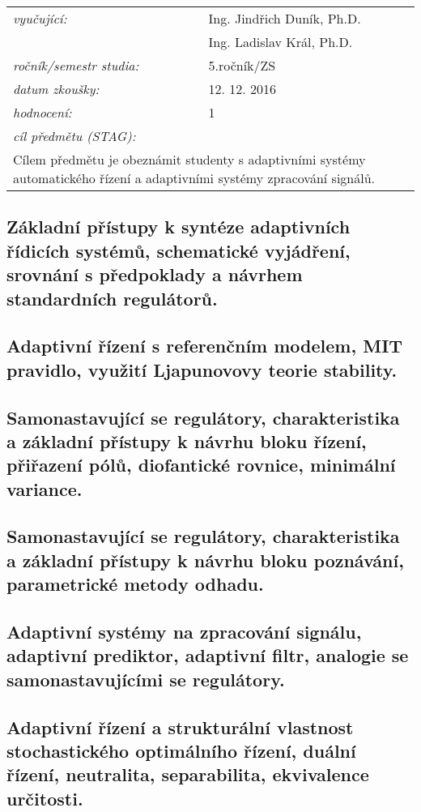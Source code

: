 \begin{table}[H]
\centering
\begin{tabular}{p{4cm} p{12cm}}
\textit{vyučující:}             & Ing. Jindřich Duník, Ph.D. \\
								 & Ing. Ladislav Král, Ph.D. \\
\textit{ročník/semestr studia:} & 5.ročník/ZS \\
\textit{datum zkoušky:}         & 12. 12. 2016 \\
\textit{hodnocení:}             & 1 \\
\textit{cíl předmětu (STAG):}   & \\
\multicolumn{2}{p{16cm}}{Cílem předmětu je obeznámit studenty s adaptivními systémy automatického řízení a adaptivními systémy zpracování signálů.}
\end{tabular}
\end{table}

\subsection{Základní přístupy k syntéze adaptivních řídicích systémů, schematické vyjádření, srovnání s předpoklady a návrhem standardních regulátorů.}

\subsection{Adaptivní řízení s referenčním modelem, MIT pravidlo, využití Ljapunovovy teorie stability.}

\subsection{Samonastavující se regulátory, charakteristika a základní přístupy k návrhu bloku řízení, přiřazení pólů, diofantické rovnice, minimální variance.}

\subsection{Samonastavující se regulátory, charakteristika a základní přístupy k návrhu bloku poznávání, parametrické metody odhadu.}

\subsection{Adaptivní systémy na zpracování signálu, adaptivní prediktor, adaptivní filtr, analogie se samonastavujícími se regulátory.}

\subsection{Adaptivní řízení a strukturální vlastnost stochastického optimálního řízení, duální řízení, neutralita, separabilita, ekvivalence určitosti.}